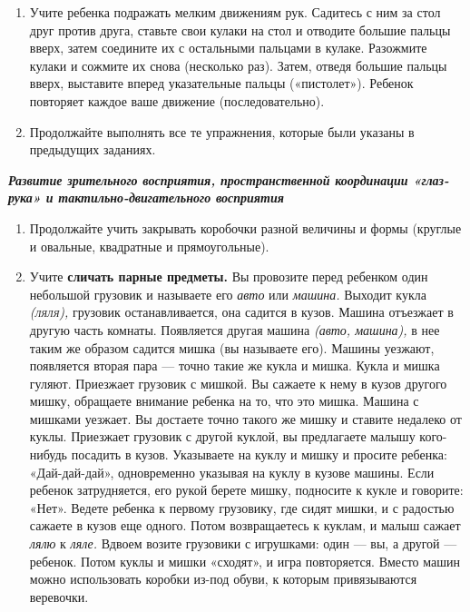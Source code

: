 \documentclass{book}
\renewcommand{\emph}[1]{\textit{#1}}
\begin{document}
\begin{enumerate}
\def\labelenumi{\arabic{enumi}.}
\setcounter{enumi}{3}
\item
  
  Учите ребенка подражать мелким движениям рук. Садитесь с ним за стол
  друг против друга, ставьте свои кулаки на стол и отводите большие
  пальцы вверх, затем соедините их с остальными пальцами в кулаке.
  Разожмите кулаки и сожмите их снова (несколько раз). Затем, отведя
  большие пальцы вверх, выставите вперед указательные пальцы
  («пистолет»). Ребенок повторяет каждое ваше движение
  (последовательно).
  
\item
  
  Продолжайте выполнять все те упражнения, которые были указаны в
  предыдущих заданиях.
  
\end{enumerate}


\emph{\textbf{Развитие зрительного восприятия, пространственной
координации «глаз-рука» и тактильно-двигательного восприятия}}


\begin{enumerate}
\def\labelenumi{\arabic{enumi}.}
\item
  
  Продолжайте учить закрывать коробочки разной величины и формы (круглые
  и овальные, квадратные и прямоугольные).
  
\item
  
  Учите \textbf{сличать парные предметы.} Вы провозите перед ребенком
  один небольшой грузовик и называете его \emph{авто} или \emph{машина.}
  Выходит кукла \emph{\textsc{(ляля),}} грузовик останавливается, она
  садится в кузов. Машина отъезжает в другую часть комнаты. Появляется
  другая машина \emph{(авто, машина),} в нее таким же образом садится
  мишка (вы называете его). Машины уезжают, появляется вторая пара ---
  точно такие же кукла и мишка. Кукла и мишка гуляют. Приезжает грузовик
  с мишкой. Вы сажаете к нему в кузов другого мишку, обращаете внимание
  ребенка на то, что это мишка. Машина с мишками уезжает. Вы достаете
  точно такого же мишку и ставите недалеко от куклы. Приезжает грузовик
  с другой куклой, вы предлагаете малышу кого-нибудь посадить в кузов.
  Указываете на куклу и мишку и просите ребенка: «Дай-дай-дай»,
  одновременно указывая на куклу в кузове машины. Если ребенок
  затрудняется, его рукой берете мишку, подносите к кукле и говорите:
  «Нет». Ведете ребенка к первому грузовику, где сидят мишки, и с
  радостью сажаете в кузов еще одного. Потом возвращаетесь к куклам, и
  малыш сажает \emph{лялю} к \emph{ляле.} Вдвоем возите грузовики с
  игрушками: один --- вы, а другой --- ребенок. Потом куклы и мишки
  «сходят», и игра повторяется. Вместо машин можно использовать коробки
  из-под обуви, к которым привязываются веревочки.
  
\end{enumerate}
\end{document}
